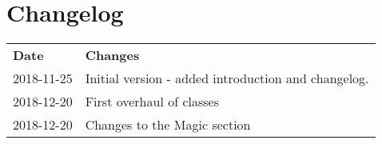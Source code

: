 \chapter*{Changelog}

\begin{tabular}{ll}
 \textbf{Date} & \textbf{Changes}\\
 2018-11-25 & Initial version - added introduction and changelog. \\
 2018-12-20 & First overhaul of classes \\
 2018-12-20 & Changes to the Magic section \\
\end{tabular}
